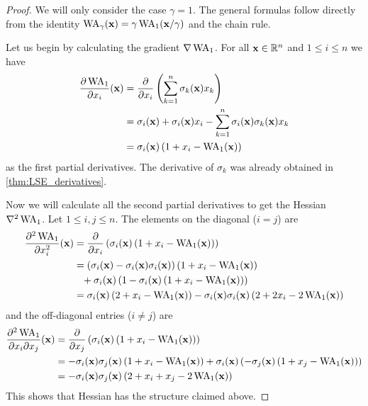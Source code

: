 \begin{proof}
 We will only consider the case \(\gamma = 1\).
 The general formulas follow directly from the identity \(\operatorname{WA}_\gamma(\mathbf{x}) = \gamma \operatorname{WA}_1(\mathbf{x}/\gamma)\) and the chain rule.
 
 Let us begin by calculating the gradient \(\nabla \operatorname{WA}_1\). 
 For all \(\mathbf{x} \in \mathbb{R}^n\) and \(1 \leq i \leq n\) we have
 \begin{align*}
  \frac{\partial \operatorname{WA}_1}{\partial x_i}(\mathbf{x}) &= \frac{\partial}{\partial x_i} \left({ \sum_{k=1}^n \sigma_k(\mathbf{x}) x_k }\right) \\
                                                  &= \sigma_i(\mathbf{x}) + \sigma_i(\mathbf{x}) x_i - \sum_{k=1}^n \sigma_i(\mathbf{x}) \sigma_k(\mathbf{x}) x_k \\
                                                  &= \sigma_i(\mathbf{x}) \left({ 1 + x_i - \operatorname{WA}_1(\mathbf{x}) }\right)
 \end{align*}
 as the first partial derivatives. 
 The derivative of \(\sigma_k\) was already obtained in \cref{thm:LSE_derivatives}.
 
 Now we will calculate all the second partial derivatives to get the Hessian \(\nabla^2 \operatorname{WA}_1\). 
 Let \(1 \leq i, j \leq n\). The elements on the diagonal (\(i = j\)) are
 \begin{align*}
  \frac{\partial^2 \operatorname{WA}_1}{\partial x_i^2} (\mathbf{x}) &= \frac{\partial}{\partial x_i} \left({ \sigma_i(\mathbf{x}) \left({ 1 + x_i - \operatorname{WA}_1(\mathbf{x}) }\right) }\right) \\
                                                       &= \left({ \sigma_i(\mathbf{x}) - \sigma_i(\mathbf{x}) \sigma_i(\mathbf{x}) }\right) \left({ 1 + x_i - \operatorname{WA}_1(\mathbf{x}) }\right) \\
                                                       &\phantom{=} + \sigma_i(\mathbf{x}) \left({ 1 - \sigma_i(\mathbf{x}) \left({ 1 + x_i - \operatorname{WA}_1(\mathbf{x}) }\right) }\right) \\
                                                       &= \sigma_i(\mathbf{x}) \left({ 2 + x_i - \operatorname{WA}_1(\mathbf{x}) }\right) - \sigma_i(\mathbf{x}) \sigma_i(\mathbf{x}) \left({ 2 + 2x_i - 2\operatorname{WA}_1(\mathbf{x}) }\right)
 \end{align*}
 and the off-diagonal entries (\(i \neq j\)) are
 \begin{align*}
  \frac{\partial^2 \operatorname{WA}_1}{\partial x_i \partial x_j} (\mathbf{x}) &= \frac{\partial}{\partial x_j} \left({ \sigma_i(\mathbf{x}) \left({ 1 + x_i - \operatorname{WA}_1(\mathbf{x}) }\right) }\right) \\
                                                                       &= - \sigma_i(\mathbf{x}) \sigma_j(\mathbf{x}) \left({ 1 + x_i - \operatorname{WA}_1(\mathbf{x}) }\right) + \sigma_i(\mathbf{x}) \left({ - \sigma_j(\mathbf{x}) \left({ 1 + x_j - \operatorname{WA}_1(\mathbf{x}) }\right) }\right) \\
                                                                       &= - \sigma_i(\mathbf{x}) \sigma_j(\mathbf{x}) \left({ 2 + x_i + x_j - 2\operatorname{WA}_1(\mathbf{x}) }\right)
 \end{align*}
 This shows that Hessian has the structure claimed above.
\end{proof}




